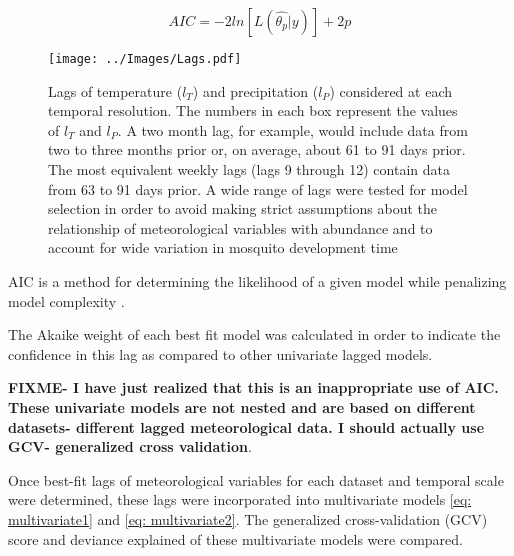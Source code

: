 \begin{equation}
	AIC = -2ln[L(\hat{\theta_{p}}|y)] + 2p
	\label{eq: AIC}
\end{equation}

\begin{figure}
	\centering
	\texttt{[image: ../Images/Lags.pdf]}
	\caption{Lags of temperature ($l_T$) and precipitation ($l_P$) considered at each temporal resolution. The numbers in each box represent the values of $l_T$ and $l_P$. A two month lag, for example, would include data from two to three months prior or, on average, about 61 to 91 days prior. The most equivalent weekly lags (lags 9 through 12) contain data from 63 to 91 days prior. A wide range of lags were tested for model selection in order to avoid making strict assumptions about the relationship of meteorological variables with abundance and to account for wide variation in mosquito development time \citep{Barrera1996, Beck-Johnson2013}}
	\label{fig:lags}
\end{figure}



AIC is a method for determining the likelihood of a given model while penalizing model complexity \citep{JOHNSON2004101}. 

The Akaike weight of each best fit model was calculated in order to indicate the confidence in this lag as compared to other univariate lagged models. 

\textbf{FIXME- I have just realized that this is an inappropriate use of AIC. These univariate models are not nested and are based on different datasets- different lagged meteorological data. I should actually use GCV- generalized cross validation}.

Once best-fit lags of meteorological variables for each dataset and temporal scale were determined, these lags were incorporated into multivariate models \ref{eq: multivariate1} and \ref{eq: multivariate2}. The generalized cross-validation (GCV) score and deviance explained of these multivariate models were compared. 


